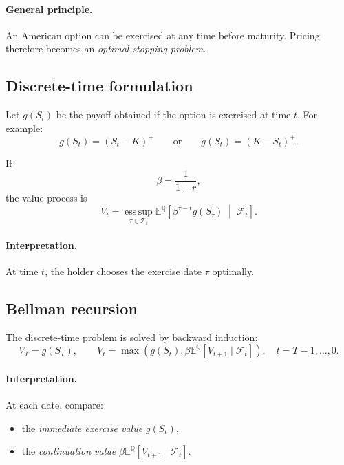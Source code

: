\documentclass[11pt]{article}
\newcommand{\Qbb}{\mathbb{Q}}
\newcommand{\E}{\mathbb{E}}
\newcommand{\1}{\mathbf{1}}
\theoremstyle{plain}
\theoremstyle{definition}
\theoremstyle{remark}
\begin{document}
\paragraph{General principle.}
An American option can be exercised at any time before maturity.
Pricing therefore becomes an \emph{optimal stopping problem}.

\medskip

\subsection{Discrete-time formulation}

Let \(g(S_t)\) be the payoff obtained if the option is exercised at time \(t\).
For example:
\[
g(S_t)=(S_t-K)^+
\qquad\text{or}\qquad
g(S_t)=(K-S_t)^+.
\]

If
\[
\beta=\frac{1}{1+r},
\]
the value process is
\[
\boxed{
V_t
=
\operatorname*{ess\,sup}_{\tau\in\mathcal{T}_t}
\E^{\Qbb}\!\left[
\beta^{\tau-t} g(S_\tau)
\;\middle|\;
\mathcal{F}_t
\right].
}
\]

\paragraph{Interpretation.}
At time \(t\), the holder chooses the exercise date \(\tau\) optimally.

\subsection{Bellman recursion}

The discrete-time problem is solved by backward induction:
\[
\boxed{
V_T=g(S_T),
\qquad
V_t=\max\!\left(g(S_t),\beta\E^{\Qbb}[V_{t+1}\mid\mathcal{F}_t]\right),
\quad t=T-1,\dots,0.
}
\]

\paragraph{Interpretation.}
At each date, compare:
\begin{itemize}[leftmargin=1.4em]
\item the \emph{immediate exercise value} \(g(S_t)\),
\item the \emph{continuation value} \(\beta\E^{\Qbb}[V_{t+1}\mid\mathcal{F}_t]\).
\end{itemize}
\end{document}
